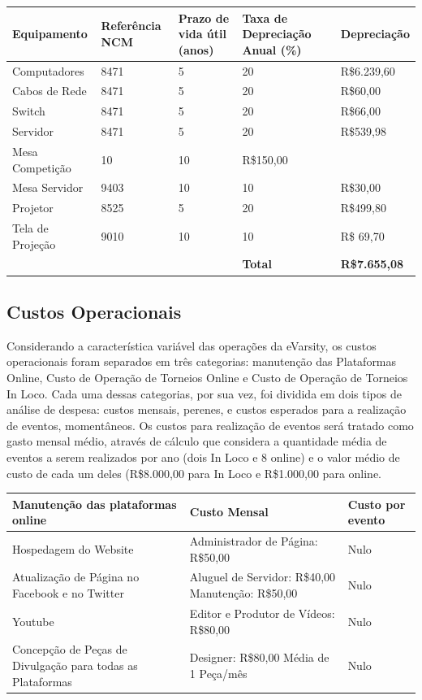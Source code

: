 \documentclass[a4paper, 12pt]{paper}
\begin{document}
\begin{table}[ht]
	\centering
	\begin{tabular}{p{3.5cm}p{2cm}p{3cm}p{3.5cm}p{2.5cm}}
		\hline
		\cellcolor{gray}Equipamento&\cellcolor{gray}Referência NCM&\cellcolor{gray}Prazo de vida útil (anos)&\cellcolor{gray}Taxa de Depreciação Anual (\%)&\cellcolor{gray}Depreciação \\
		\hline
		Computadores&8471&5&20&R\$6.239,60\\
		Cabos de Rede&8471&5&20&R\$60,00\\
		Switch&8471&5&20&R\$66,00\\
		Servidor&8471&5&20&R\$539,98\\
		Mesa Competição&10&10&R\$150,00\\
		Mesa Servidor&9403&10&10&R\$30,00\\		
		Projetor&8525&5&20&R\$499,80\\		
		Tela de Projeção&9010&10&10&R\$ 69,70\\				
		\hline
		&&&\textbf{Total}&\textbf{R\$7.655,08}\\
		\hline
	\end{tabular}
\end{table}
\subsection{Custos Operacionais}
Considerando a característica variável das operações da eVarsity, os custos operacionais foram separados em três categorias: manutenção das Plataformas Online, Custo de Operação de Torneios Online e Custo de Operação de Torneios In Loco. Cada uma dessas categorias, por sua vez, foi dividida em dois tipos de análise de despesa: custos mensais, perenes, e custos esperados para a realização de eventos, momentâneos. Os custos para realização de eventos será tratado como gasto mensal médio, através de cálculo que considera a quantidade média de eventos a serem realizados por ano (dois In  Loco e 8 online) e o valor médio de custo de cada um deles (R\$8.000,00 para In Loco e R\$1.000,00 para online.

\begin{table}[ht]
	\centering
	\begin{tabular}{p{6cm}p{7cm}p{2cm}}
		\hline
		\cellcolor{gray}Manutenção das plataformas online&\cellcolor{gray}Custo Mensal&\cellcolor{gray}Custo por evento\\
		\hline
		Hospedagem do Website&Administrador de Página: R\$50,00&Nulo\\
		Atualização de Página no Facebook e no Twitter&Aluguel de Servidor: R\$40,00
		Manutenção: R\$50,00&Nulo\\
		Youtube&Editor e Produtor de Vídeos: R\$80,00&Nulo\\
		Concepção de Peças de Divulgação para todas as Plataformas&Designer: R\$80,00
		Média de 1 Peça/mês&Nulo\\
		\hline
	\end{tabular}
\end{table}
\end{document}
